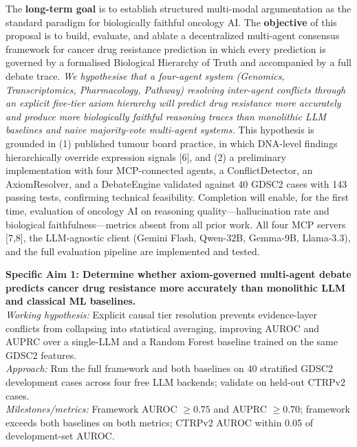 \documentclass[11pt, letterpaper]{article}
\begin{document}
The \textbf{long-term goal} is to establish structured multi-modal argumentation as the
standard paradigm for biologically faithful oncology AI. The \textbf{objective} of this
proposal is to build, evaluate, and ablate a decentralized multi-agent consensus framework
for cancer drug resistance prediction in which every prediction is governed by a formalised
Biological Hierarchy of Truth and accompanied by a full debate trace.
\textit{We hypothesise that a four-agent system (Genomics, Transcriptomics, Pharmacology,
Pathway) resolving inter-agent conflicts through an explicit five-tier axiom hierarchy will
predict drug resistance more accurately and produce more biologically faithful reasoning
traces than monolithic LLM baselines and naive majority-vote multi-agent systems.}
This hypothesis is grounded in (1) published tumour board practice, in which DNA-level
findings hierarchically override expression signals [6], and (2) a preliminary implementation
with four MCP-connected agents, a ConflictDetector, an AxiomResolver, and a DebateEngine
validated against 40 GDSC2 cases with 143 passing tests, confirming technical feasibility.
Completion will enable, for the first time, evaluation of oncology AI on reasoning
quality---hallucination rate and biological faithfulness---metrics absent from all prior work.
All four MCP servers [7,8], the LLM-agnostic client (Gemini Flash, Qwen-32B, Gemma-9B,
Llama-3.3), and the full evaluation pipeline are implemented and tested.

\textbf{Specific Aim 1: Determine whether axiom-governed multi-agent debate predicts cancer
drug resistance more accurately than monolithic LLM and classical ML baselines.}\\
\textit{Working hypothesis:} Explicit causal tier resolution prevents evidence-layer conflicts
from collapsing into statistical averaging, improving AUROC and AUPRC over a single-LLM and
a Random Forest baseline trained on the same GDSC2 features.\\
\textit{Approach:} Run the full framework and both baselines on 40 stratified GDSC2 development
cases across four free LLM backends; validate on held-out CTRPv2 cases.\\
\textit{Milestones/metrics:} Framework AUROC $\geq 0.75$ and AUPRC $\geq 0.70$; framework
exceeds both baselines on both metrics; CTRPv2 AUROC within 0.05 of development-set AUROC.
\end{document}
